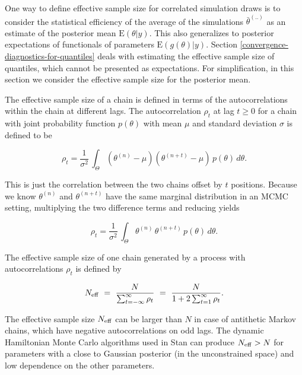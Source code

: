 \documentclass[american,]{article}
\begin{document}
One way to define effective sample size for correlated simulation draws
is to consider the statistical efficiency of the average of the
simulations \(\bar{\theta}^{(..)}\) as an estimate of the posterior mean
\(\mbox{E}(\theta | y)\). This also generalizes to posterior
expectations of functionals of parameters \(\mbox{E}(g(\theta) | y)\).
Section \ref{convergence-diagnostics-for-quantiles} deals with 
estimating the effective sample size of
quantiles, which cannot be presented as expectations. For simplification,
in this section we consider the effective sample size for the posterior
mean.

The effective sample size of a chain is defined in terms of the
autocorrelations within the chain at different lags. The autocorrelation
\(\rho_t\) at lag \(t \geq 0\) for a chain with joint probability
function \(p(\theta)\) with mean \(\mu\) and standard deviation \(\sigma\) is
defined to be

\begin{equation}
\rho_t = \frac{1}{\sigma^2} \, \int_{\Theta} (\theta^{(n)} - \mu)
(\theta^{(n+t)} - \mu) \, p(\theta) \, d \theta.
\end{equation}

This is just the correlation between the two chains offset by \(t\)
positions. Because we know \(\theta^{(n)}\) and \(\theta^{(n+t)}\) have
the same marginal distribution in an MCMC setting, multiplying the two
difference terms and reducing yields

\begin{equation}
\rho_t = \frac{1}{\sigma^2} \, \int_{\Theta} \theta^{(n)} \, \theta^{(n+t)}
\, p(\theta) \, d \theta.
\end{equation}

The effective sample size of one chain generated by a process with
autocorrelations \(\rho_t\) is defined by

\begin{equation}
N_{\rm eff} \ = \
\frac{N}{\sum_{t = -\infty}^{\infty} \rho_t} \ = \
\frac{N}{1 + 2 \sum_{t = 1}^{\infty} \rho_t}.
\end{equation}

The effective sample size \(N_{\rm eff}\) can be larger than \(N\) in case
of antithetic Markov chains, which have negative autocorrelations on odd
lags. The dynamic Hamiltonian Monte Carlo algorithms used in Stan
\citep{Hoffman+Gelman:2014, betancourt2017conceptual} can produce
\(N_{\rm eff}>N\) for parameters with a close to Gaussian posterior (in
the unconstrained space) and low dependence on the other parameters.
\end{document}
